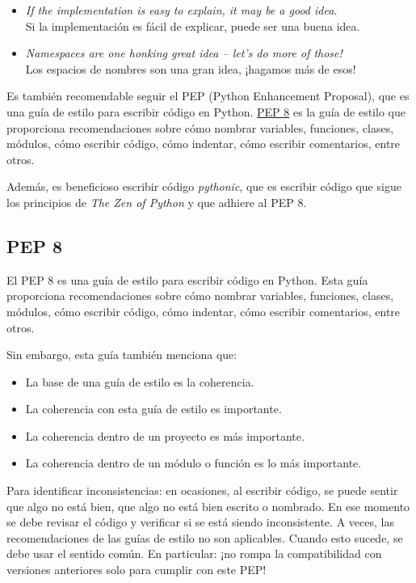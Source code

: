 \documentclass[executivepaper]{article}
\begin{document}
\begin{itemize}
    \item \emph{If the implementation is easy to explain, it may be a good idea.} \\
    Si la implementación es fácil de explicar, puede ser una buena idea.
    
    \item \emph{Namespaces are one honking great idea -- let's do more of those!} \\
    Los espacios de nombres son una gran idea, ¡hagamos más de esos!
\end{itemize}

Es también recomendable seguir el PEP (Python Enhancement Proposal), que es una guía de estilo para escribir código en Python. \href{https://www.python.org/dev/peps/pep-0008/}{PEP 8} es la guía de estilo que proporciona recomendaciones sobre cómo nombrar variables, funciones, clases, módulos, cómo escribir código, cómo indentar, cómo escribir comentarios, entre otros.

Además, es beneficioso escribir código \emph{pythonic}, que es escribir código que sigue los principios de \emph{The Zen of Python} y que adhiere al PEP 8.

\subsection{PEP 8}
El PEP 8 es una guía de estilo para escribir código en Python. Esta guía proporciona recomendaciones sobre cómo nombrar variables, funciones, clases, módulos, cómo escribir código, cómo indentar, cómo escribir comentarios, entre otros.

Sin embargo, esta guía también menciona que:
\begin{itemize}
    \item La base de una guía de estilo es la coherencia.
    \item La coherencia con esta guía de estilo es importante.
    \item La coherencia dentro de un proyecto es más importante.
    \item La coherencia dentro de un módulo o función es lo más importante.
\end{itemize}

Para identificar inconsistencias: en ocasiones, al escribir código, se puede sentir que algo no está bien, que algo no está bien escrito o nombrado. En ese momento se debe revisar el código y verificar si se está siendo inconsistente. A veces, las recomendaciones de las guías de estilo no son aplicables. Cuando esto sucede, se debe usar el sentido común. En particular: ¡no rompa la compatibilidad con versiones anteriores solo para cumplir con este PEP!
\end{document}
